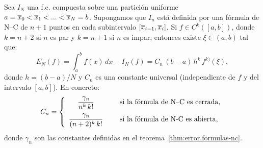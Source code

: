 \begin{theorem}
  \label{thm:cota.error.fc.compuestas-nc}
  Sea $I_N$ una f.c. compuesta sobre una partición uniforme
  $a=\overline x_0<\overline x_1<...<\overline x_N=b$. Supongamos que $I_n$ está definida por una
  fórmula de N--C de $n+1$ puntos en cada subintervalo
  $[\overline x_{i-1},\overline x_i]$.  Si $f\in C^k([a,b])$, donde $k=n+2$ si $n$ es par
  y $k=n+1$ si $n$ es impar, entonces existe $\xi\in(a,b)$ tal que:
  \begin{equation}
    \label{eq:error.fc.compuesta-NC}
   E_N(f)= \int_a^bf(x)\,dx - I_N(f)
   = C_n \, (b-a) \, h^{k} \, f^{k)}(\xi),
  \end{equation}
  donde $h=(b-a)/N$ y $C_n$ es una constante universal (independiente
  de $f$ y del intervalo $[a,b]$). En concreto:
  \begin{equation*}
  C_n=\left\{
    \begin{array}{cl}
      \displaystyle\frac{\gamma_n}{n^k\,k!} & \quad \text{ si la fórmula de N--C es
        cerrada},
      \\ \noalign{\medskip}
      \displaystyle\displaystyle\frac{\gamma_n}{(n+2)^k\,k!} &\quad \text{ si la fórmula
        de N-C es abierta},
    \end{array}
  \right.
\end{equation*}
  donde $\gamma_n$ son las constantes definidas en el
  teorema~\ref{thm:error.formulas-nc}.
\end{theorem}

